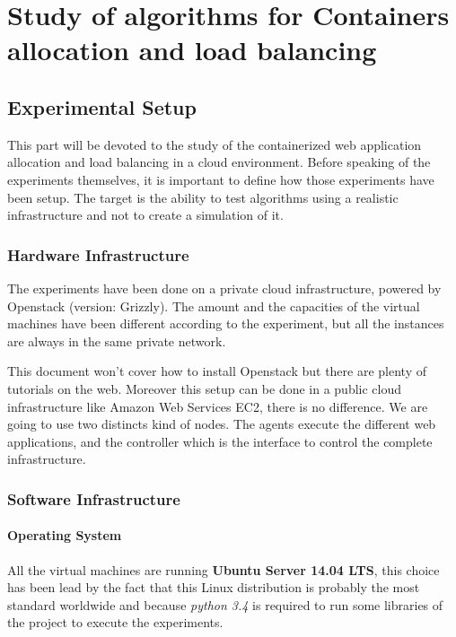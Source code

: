 \chapter{Study of algorithms for Containers allocation and load balancing}
\label{containerloadbalance}

\section{Experimental Setup}

This part will be devoted to the study of the containerized web application
allocation and load balancing in a cloud environment. Before speaking of the
experiments themselves, it is important to define how those experiments have
been setup. The target is the ability to test algorithms using a realistic
infrastructure and not to create a simulation of it.

\subsection{Hardware Infrastructure}

The experiments have been done on a private cloud infrastructure, powered by
Openstack (version: Grizzly). The amount and the capacities of the virtual
machines have been different according to the experiment, but all the instances
are always in the same private network.

This document won't cover how to install Openstack but there are plenty of
tutorials on the web. Moreover this setup can be done in a public cloud
infrastructure like Amazon Web Services EC2, there is no difference. We are
going to use two distincts kind of nodes. The agents execute the
different web applications, and the controller which is the interface to
control the complete infrastructure.

\subsection{Software Infrastructure}
\subsubsection{Operating System}

All the virtual machines are running \textbf{Ubuntu Server 14.04 LTS}, this choice
has been lead by the fact that this Linux distribution is probably the most standard
worldwide and because \textit{python 3.4} is required to run some libraries of the project
to execute the experiments.

